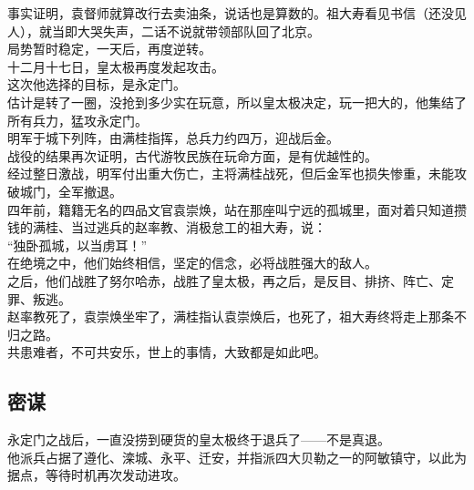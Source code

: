 \begin{multicols}{\theparacolNo}
事实证明，袁督师就算改行去卖油条，说话也是算数的。祖大寿看见书信（还没见人），就当即大哭失声，二话不说就带领部队回了北京。\\

局势暂时稳定，一天后，再度逆转。\\

十二月十七日，皇太极再度发起攻击。\\

这次他选择的目标，是永定门。\\

估计是转了一圈，没抢到多少实在玩意，所以皇太极决定，玩一把大的，他集结了所有兵力，猛攻永定门。\\

明军于城下列阵，由满桂指挥，总兵力约四万，迎战后金。\\

战役的结果再次证明，古代游牧民族在玩命方面，是有优越性的。\\

经过整日激战，明军付出重大伤亡，主将满桂战死，但后金军也损失惨重，未能攻破城门，全军撤退。\\

四年前，籍籍无名的四品文官袁崇焕，站在那座叫宁远的孤城里，面对着只知道攒钱的满桂、当过逃兵的赵率教、消极怠工的祖大寿，说：\\

“独卧孤城，以当虏耳！”\\

在绝境之中，他们始终相信，坚定的信念，必将战胜强大的敌人。\\

之后，他们战胜了努尔哈赤，战胜了皇太极，再之后，是反目、排挤、阵亡、定罪、叛逃。\\

赵率教死了，袁崇焕坐牢了，满桂指认袁崇焕后，也死了，祖大寿终将走上那条不归之路。\\

共患难者，不可共安乐，世上的事情，大致都是如此吧。\\

\subsection{密谋}
永定门之战后，一直没捞到硬货的皇太极终于退兵了——不是真退。\\

他派兵占据了遵化、滦城、永平、迁安，并指派四大贝勒之一的阿敏镇守，以此为据点，等待时机再次发动进攻。\\


\end{multicols}
